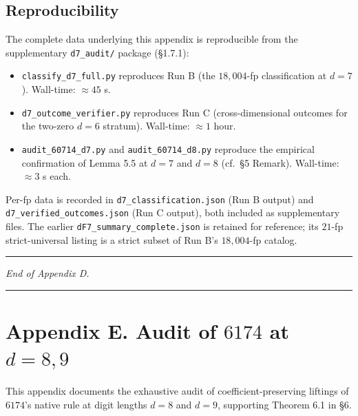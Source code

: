 \documentclass[11pt,letterpaper]{article}
\providecommand{\tightlist}{%
  \setlength{\itemsep}{0pt}\setlength{\parskip}{0pt}}
\theoremstyle{paperstyle}
\theoremstyle{paperstyledef}
\theoremstyle{paperstylerem}
\begin{document}
\hypertarget{d.6-reproducibility}{%
\subsection{Reproducibility}\label{d.6-reproducibility}}

The complete data underlying this appendix is reproducible from the
supplementary \texttt{d7\_audit/} package (§1.7.1):

\begin{itemize}
\tightlist
\item
  \texttt{classify\_d7\_full.py} reproduces Run B (the \(18{,}004\)-fp
  classification at \(d = 7\)). Wall-time: \(\approx 45\) s.
\item
  \texttt{d7\_outcome\_verifier.py} reproduces Run C (cross-dimensional
  outcomes for the two-zero \(d = 6\) stratum). Wall-time: \(\approx 1\)
  hour.
\item
  \texttt{audit\_60714\_d7.py} and \texttt{audit\_60714\_d8.py}
  reproduce the empirical confirmation of Lemma 5.5 at \(d = 7\) and
  \(d = 8\) (cf.~§5 Remark). Wall-time: \(\approx 3\) s each.
\end{itemize}

Per-fp data is recorded in \texttt{d7\_classification.json} (Run B
output) and \texttt{d7\_verified\_outcomes.json} (Run C output), both
included as supplementary files. The earlier
\texttt{dF7\_summary\_complete.json} is retained for reference; its
\(21\)-fp strict-universal listing is a strict subset of Run B's
\(18{,}004\)-fp catalog.

\begin{center}\rule{0.5\linewidth}{0.5pt}\end{center}

\emph{End of Appendix D.}

\begin{center}\rule{0.5\linewidth}{0.5pt}\end{center}

\hypertarget{appendix-e.-audit-of-6174-at-d-8-9}{%
\section{\texorpdfstring{Appendix E. Audit of \(6174\) at
\(d = 8, 9\)}{Appendix E. Audit of 6174 at d = 8, 9}}\label{appendix-e.-audit-of-6174-at-d-8-9}}

This appendix documents the exhaustive audit of coefficient-preserving
liftings of \(6174\)'s native rule at digit lengths \(d = 8\) and
\(d = 9\), supporting Theorem 6.1 in §6.
\end{document}
